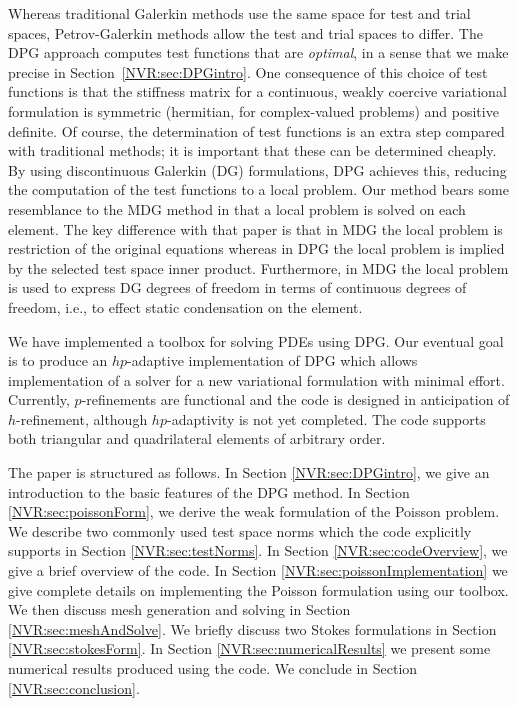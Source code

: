 Whereas traditional Galerkin methods use the same space for test and trial spaces, Petrov-Galerkin methods allow the test and trial spaces to differ.  The DPG approach computes test functions that are \emph{optimal}, in a sense that we make precise in Section~\ref{NVR:sec:DPGintro}.  One consequence of this choice of test functions is that the stiffness matrix for a continuous, weakly coercive variational formulation is symmetric (hermitian, for complex-valued problems) and positive definite.  Of course, the determination of test functions is an extra step compared with traditional methods; it is important that these can be determined cheaply.  By using discontinuous Galerkin (DG) formulations, DPG achieves this, reducing the computation of the test functions to a local problem.  Our method bears some resemblance to the MDG method \cite{Hughes} in that a local problem is solved on each element. The key difference with that paper is that in MDG the local problem is restriction of the original equations whereas in DPG the local problem is implied by the selected test space inner product. Furthermore, in MDG the local problem is used to express DG degrees of freedom in terms of continuous degrees of freedom, i.e., to effect static condensation on the element.

We have implemented a toolbox for solving PDEs using DPG.  Our eventual goal is to produce an $hp$-adaptive implementation of DPG which allows implementation of a solver for a new variational formulation with minimal effort.  Currently, $p$-refinements are functional and the code is designed in anticipation of $h$-refinement, although $hp$-adaptivity is not yet completed.  The code supports both triangular and quadrilateral elements of arbitrary order.

The paper is structured as follows.  In Section \ref{NVR:sec:DPGintro}, we give an introduction to the basic features of the DPG method.  In Section \ref{NVR:sec:poissonForm}, we derive the weak formulation of the Poisson problem.  We describe two commonly used test space norms which the code explicitly supports in Section \ref{NVR:sec:testNorms}.  In Section \ref{NVR:sec:codeOverview}, we give a brief overview of the code.  In Section \ref{NVR:sec:poissonImplementation} we give complete details on implementing the Poisson formulation using our toolbox.  We then discuss mesh generation and solving in Section \ref{NVR:sec:meshAndSolve}.  We briefly discuss two Stokes formulations in Section \ref{NVR:sec:stokesForm}.  In Section \ref{NVR:sec:numericalResults} we present some numerical results produced using the code.  We conclude in Section \ref{NVR:sec:conclusion}.

